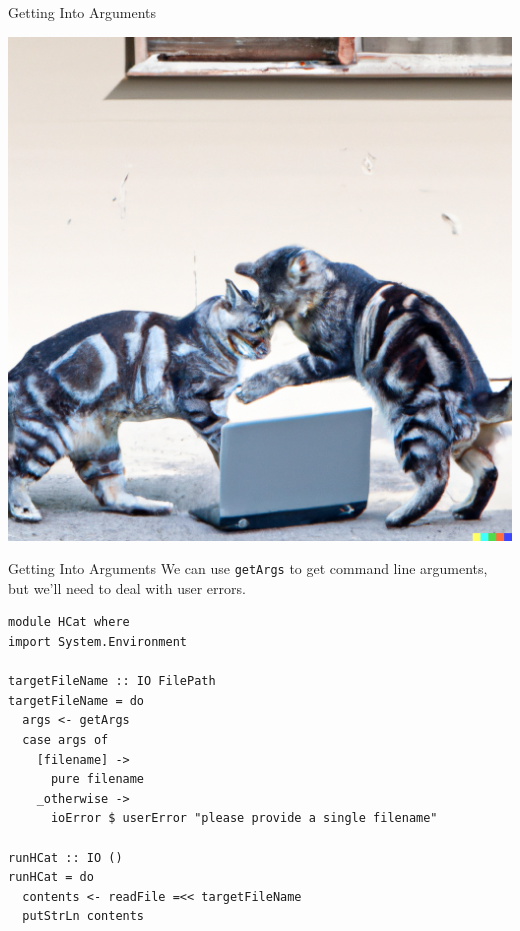 \documentclass[10pt, presentation, colorlinks]{beamer}
\begin{document}
\begin{frame}[label={sec:org7fcc528}]{Getting Into Arguments}
\begin{center}
\includegraphics[height=0.6\textheight]{./img/arguments.png}
\end{center}
\end{frame}

\begin{frame}[label={sec:orgac3afbf},fragile]{Getting Into Arguments}
 We can use \alert{\texttt{getArgs}} to get command line arguments, but we'll need to
deal with user errors.

\bigskip
\pause

\begin{verbatim}
module HCat where
import System.Environment

targetFileName :: IO FilePath
targetFileName = do
  args <- getArgs
  case args of
    [filename] ->
      pure filename
    _otherwise ->
      ioError $ userError "please provide a single filename"

runHCat :: IO ()
runHCat = do
  contents <- readFile =<< targetFileName
  putStrLn contents
\end{verbatim}
\end{frame}
\end{document}
